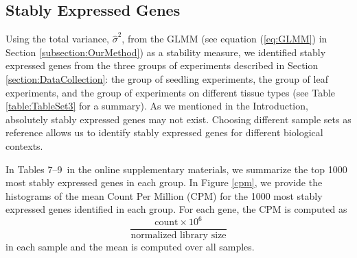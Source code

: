\documentclass[letterpaper,12pt]{article}
\newcommand{\supptabletwo}{7--9~}
\begin{document}
\subsection{Stably Expressed Genes}\label{section:stablyExpressedGene}
Using the total variance, $\hat\sigma^2$, from the GLMM (see
equation (\ref{eq:GLMM}) in Section \ref{subsection:OurMethod}) as a
stability measure, we identified stably expressed genes from the three groups
of experiments described in Section \ref{section:DataCollection}: the group of
seedling experiments, the group of leaf experiments, and the group of
experiments on different tissue types (see Table \ref{table:TableSet3} for a
summary).
As we mentioned in the Introduction, absolutely stably expressed genes may not
exist.  Choosing different sample sets as reference allows us to identify
stably expressed genes for different biological contexts.

In Tables \supptabletwo in the online supplementary materials, we summarize the
top 1000 most stably expressed genes in each group.  In Figure \ref{cpm}, we
provide the histograms of the mean Count Per Million (CPM) for the 1000
most stably expressed genes identified in each group. For each gene, the CPM
is computed as
\begin{equation}\label{eq:cpm}
\dfrac{ \text{count} \times 10^6 }{ \text{normalized library size}} 
\end{equation}
in each sample and the mean is computed over all samples.
\end{document}
